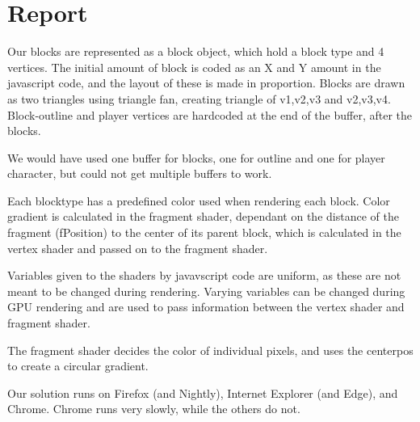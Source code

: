 \section{Report}



Our blocks are represented as a block object, which hold a block type and 4 vertices.
The initial amount of block is coded as an X and Y amount in the javascript code,
and the layout of these is made in proportion.
Blocks are drawn as two triangles using triangle fan, creating triangle of v1,v2,v3 and v2,v3,v4.
Block-outline and player vertices are hardcoded at the end of the buffer, after the blocks.

We would have used one buffer for blocks, 
one for outline and one for player character, 
but could not get multiple buffers to work.


Each blocktype has a predefined color used when rendering each block.
Color gradient is calculated in the fragment shader, 
dependant on the distance of the fragment (fPosition) to the center of its parent block,
which is calculated in the vertex shader and passed on to the fragment shader.


Variables given to the shaders by javavscript code are uniform, 
as these are not meant to be changed during rendering.
Varying variables can be changed during GPU rendering and are 
used to pass information between the vertex shader and fragment shader.



The fragment shader decides the color of individual pixels, 
and uses the centerpos to create a circular gradient.


Our solution runs on Firefox (and Nightly), Internet Explorer (and Edge), and Chrome.
Chrome runs very slowly, while the others do not.
